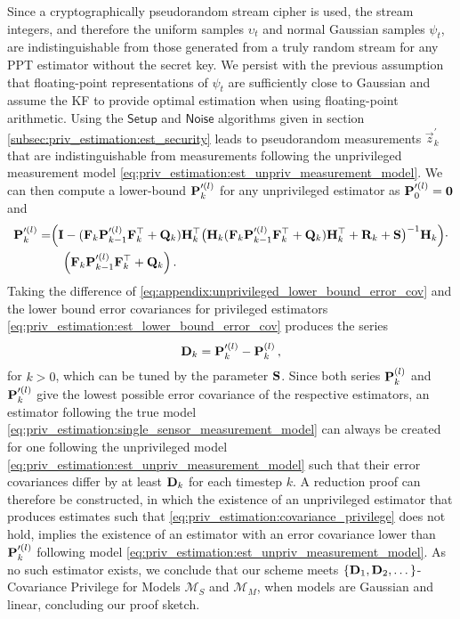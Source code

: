 Since a cryptographically pseudorandom stream cipher is used, the stream integers, and therefore the uniform samples $\upsilon_t$ and normal Gaussian samples $\psi_t$, are indistinguishable from those generated from a truly random stream for any PPT estimator without the secret key. We persist with the previous assumption that floating-point representations of $\psi_t$ are sufficiently close to Gaussian and assume the KF to provide optimal estimation when using floating-point arithmetic. Using the $\mathsf{Setup}$ and $\mathsf{Noise}$ algorithms given in section \ref{subsec:priv_estimation:est_security} leads to pseudorandom measurements $\vec{z}^\prime_k$ that are indistinguishable from measurements following the unprivileged measurement model \eqref{eq:priv_estimation:est_unpriv_measurement_model}. We can then compute a lower-bound ${{\mathbf{P}}}_k^{\prime(l)}$ for any unprivileged estimator as ${{\mathbf{P}}}_0^{\prime(l)}={{\mathbf{0}}}$ and
\begin{equation}\label{eq:appendix:unprivileged_lower_bound_error_cov}
   \begin{split}
      {\ensuremath{{\mathbf{P}}}}_k^{\prime(l)} =& \Bigl( {{\mathbf{I}}} - ({{\mathbf{F}}}_k{{\mathbf{P}}}_{k-1}^{\prime(l)}{{\mathbf{F}}}_k^\top + {{\mathbf{Q}}}_k){{\mathbf{H}}}_k^\top\bigl({{\mathbf{H}}}_k({{\mathbf{F}}}_k{{\mathbf{P}}}_{k-1}^{\prime(l)}{{\mathbf{F}}}_k^\top + {{\mathbf{Q}}}_k){{\mathbf{H}}}_k^\top + {{\mathbf{R}}}_k+{{\mathbf{S}}}\bigr)^{-1}{{\mathbf{H}}}_k\Bigr)\cdot\\
      &\quad\Bigl({{\mathbf{F}}}_k{{\mathbf{P}}}_{k-1}^{\prime(l)}{{\mathbf{F}}}_k^\top + {{\mathbf{Q}}}_k\Bigr)\,.
   \end{split}
\end{equation}
Taking the difference of \eqref{eq:appendix:unprivileged_lower_bound_error_cov} and the lower bound error covariances for privileged estimators \eqref{eq:priv_estimation:est_lower_bound_error_cov} produces the series
\begin{equation}\label{eq:appendix:covariance_difference_series}
   {\ensuremath{{\mathbf{D}}}}_k = {{\mathbf{P}}}_k^{\prime(l)} - {{\mathbf{P}}}_k^{(l)}\,,
\end{equation}
for $k>0$, which can be tuned by the parameter ${{\mathbf{S}}}$. Since both series ${{\mathbf{P}}}_k^{(l)}$ and ${{\mathbf{P}}}_k^{\prime(l)}$ give the lowest possible error covariance of the respective estimators, an estimator following the true model \eqref{eq:priv_estimation:single_sensor_measurement_model} can always be created for one following the unprivileged model \eqref{eq:priv_estimation:est_unpriv_measurement_model} such that their error covariances differ by at least ${{\mathbf{D}}}_k$ for each timestep $k$. A reduction proof can therefore be constructed, in which the existence of an unprivileged estimator that produces estimates such that \eqref{eq:priv_estimation:covariance_privilege} does not hold, implies the existence of an estimator with an error covariance lower than ${{\mathbf{P}}}_k^{\prime(l)}$ following model \eqref{eq:priv_estimation:est_unpriv_measurement_model}. As no such estimator exists, we conclude that our scheme meets $\{{{\mathbf{D}}}_1,{{\mathbf{D}}}_2,\dots\}$-Covariance Privilege for Models $\mathcal{M}_S$ and $\mathcal{M}_M$, when models are Gaussian and linear, concluding our proof sketch.